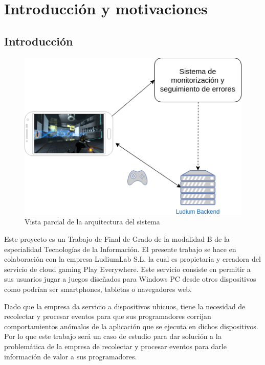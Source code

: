 \chapter{Introducción y motivaciones}

\section{Introducción}

\begin{figure}[!htb]
	\includegraphics[width=\linewidth] {Moduloss-Intro.png}
	\caption{Vista parcial de la arquitectura del sistema}
	\label{fig:intro}
\end{figure}

Este proyecto es un Trabajo de Final de Grado de la modalidad B de la especialidad Tecnologías de la Información. El presente trabajo se hace en colaboración con la empresa LudiumLab S.L. la cual es propietaria y creadora del servicio de cloud gaming Play Everywhere. Este servicio consiste en permitir a sus usuarios jugar a juegos diseñados para Windows PC desde otros dispositivos como podrían ser smartphones, tabletas o navegadores web. 

Dado que la empresa da servicio a dispositivos ubicuos, tiene la necesidad de recolectar y procesar eventos para que sus programadores corrijan comportamientos anómalos de la aplicación que se ejecuta en dichos dispositivos. Por lo que este trabajo será un caso de estudio para dar solución a la problemática de la empresa de recolectar y procesar eventos para darle información de valor a sus programadores.

